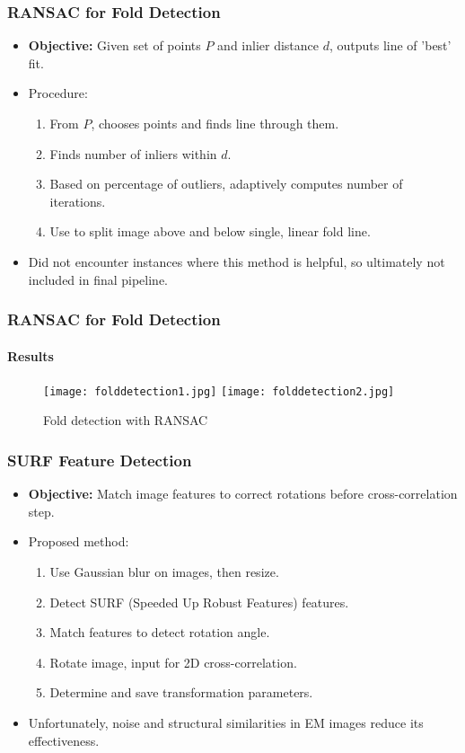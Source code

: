 \documentclass{beamer}
\begin{document}
\begin{frame}
\frametitle{RANSAC for Fold Detection}
\begin{itemize}
\item \textbf{Objective:} Given set of points $P$ and inlier distance $d$, outputs line of 'best' fit.
\item Procedure: 
\begin{enumerate}
\item From $P$, chooses points and finds line through them. 
\item Finds number of inliers within $d$. 
\item Based on percentage of outliers, adaptively computes number of iterations.
\item Use to split image above and below single, linear fold line.
\end{enumerate}
\item Did not encounter instances where this method is helpful, so ultimately not included in final pipeline.
\end{itemize}
\end{frame}

\begin{frame}
\frametitle{RANSAC for Fold Detection}
\framesubtitle{Results}
\begin{figure}[p]
    \centering
    \texttt{[image: folddetection1.jpg]}
    \texttt{[image: folddetection2.jpg]}
    \caption{Fold detection with RANSAC}
	\label{fig:RANSAC ex}
\end{figure}
\end{frame}

\begin{frame}
\frametitle{SURF Feature Detection}
\begin{itemize}
\item \textbf{Objective:} Match image features to correct rotations before cross-correlation step. 
\item Proposed method:
\begin{enumerate}
\item Use Gaussian blur on images, then resize.
\item Detect SURF (Speeded Up Robust Features) features. 
\item Match features to detect rotation angle. 
\item Rotate image, input for 2D cross-correlation.
\item Determine and save transformation parameters.
\end{enumerate}
\item Unfortunately, noise and structural similarities in EM images reduce its effectiveness.
\end{itemize}
\end{frame}
\end{document}
